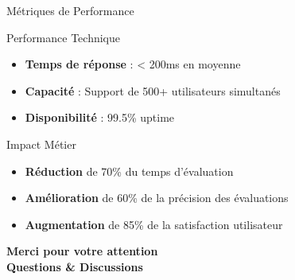 \documentclass[aspectratio=169]{beamer}
\begin{document}
\begin{frame}{Métriques de Performance}
    \begin{block}{Performance Technique}
        \begin{itemize}
            \item \textbf{Temps de réponse} : < 200ms en moyenne
            \item \textbf{Capacité} : Support de 500+ utilisateurs simultanés
            \item \textbf{Disponibilité} : 99.5\% uptime
        \end{itemize}
    \end{block}

    \begin{block}{Impact Métier}
        \begin{itemize}
            \item \textbf{Réduction} de 70\% du temps d'évaluation
            \item \textbf{Amélioration} de 60\% de la précision des évaluations
            \item \textbf{Augmentation} de 85\% de la satisfaction utilisateur
        \end{itemize}
    \end{block}
\end{frame}

\begin{frame}[plain]

    \vspace{3cm}
    \begin{center}
        {\Huge\color{white}\textbf{Merci pour votre attention}}\\[2em]
        {\Large\color{capgeminiblue}\textbf{Questions \& Discussions}}\\[2em]

    \end{center}
\end{frame}
\end{document}
